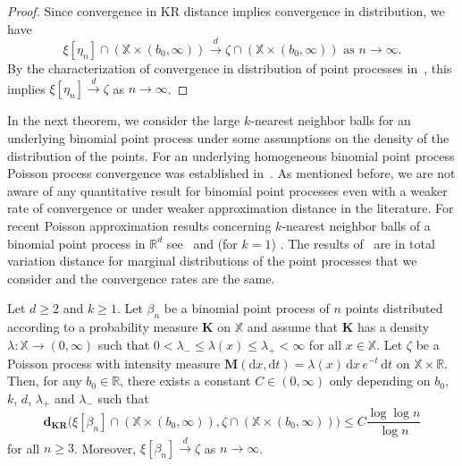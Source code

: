 \documentclass[AHL,Unicode,longabstracts]{cedram}
\newcommand*\bM{\mathbf{M}}
\newcommand*\bK{\mathbf{K}}
\newcommand*\dkr{\mathbf{d_{KR}}}
\newcommand*\R{\mathbb{R}}
\newcommand*\X{\mathbb{X}}
\newcommand*\md{\mathrm{d}}
\begin{document}
\begin{proof}
Since convergence in KR distance implies convergence in distribution, we have
\[
\xi[\eta_n] \cap (\X \times (b_0,\infty))\stackrel{d}{\to}\zeta \cap (\X \times (b_0,\infty))\text{ as }n\to\infty.
\]
By the characterization of convergence in distribution of point processes in~\cite[Theorem~16.16]{KallenbergFoundations}, this implies $\xi[\eta_n] \stackrel{d}{\to}\zeta $ as $n\to\infty$.
\end{proof}


In the next theorem, we consider the large $k$-nearest neighbor balls for an underlying binomial point process {under some assumptions on the density of the distribution of the points.} {For an underlying homogeneous binomial point process Poisson process convergence was established in~\cite{Penrose1997}.} As mentioned before, we are not aware of any {quantitative} result for binomial point processes even with a weaker rate of convergence or under weaker approximation distance in the literature. For recent Poisson approximation results concerning $k$-nearest neighbor balls of a binomial point process in $\R^d$ see~\cite{Chenavier2021} and (for $k=1$) \cite{GyoerfiHenzeWalk2019}. The results of~\cite{Chenavier2021} are in total variation distance for marginal distributions of the point processes that we consider and the convergence rates are the same.

\begin{theo}\label{t:knnapproxbin}
Let $d \geq 2$ and $k \geq 1$. Let $\beta_n$ be a binomial point process of $n$ points distributed according to a probability measure $\bK$ on $\X$ and assume that $\bK$ has a density $\lambda : \X \to (0,\infty)$ such that $0 < \lambda_- \le \lambda(x) \le \lambda_+ < \infty$ for all $x\in \X$. Let $\zeta$ be a Poisson process with intensity measure $\bM(\md x,\md t) = \lambda(x) \, \md x \, e^{-t} \, \md t$ on $\X \times \R$. Then, for any $b_0 \in \R$, there exists a constant $C\in(0,\infty)$ only depending on $b_0$, $k$, $d$, $\lambda_+$ and $\lambda_-$ such that
\begin{equation}\label{e:knnbinbd}
\dkr\big(\xi\left[\beta_n\right] \cap \left(\X \times \left(b_0,\infty\right)\right),\zeta \cap \left(\X \times \left(b_0,\infty\right)\right)\big) \leq C \frac{\log \log n}{\log n}
\end{equation}
for all $n\ge 3$. Moreover, $\xi[\beta_n] \stackrel{d}{\to} \zeta$ as $n \to \infty$.
\end{theo}
\end{document}

